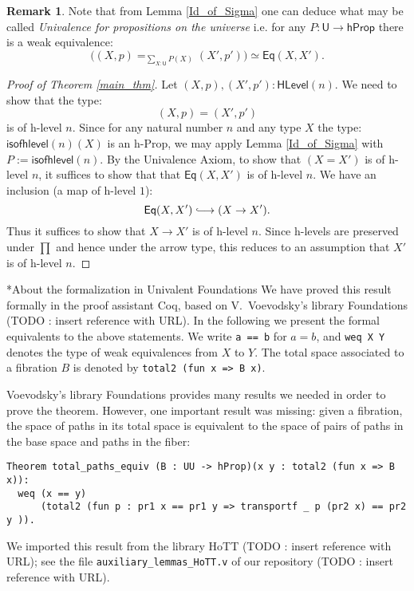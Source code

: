 \documentclass[11pt]{amsart}
\makeatletter
\theoremstyle{plain}
\theoremstyle{definition}
\newtheorem{remark}[theorem]{Remark}
\newcommand{\Eq}{\mathsf{Eq}}
\newcommand{\HLevel}{\mathsf{HLevel}}
\newcommand{\hProp}{\mathsf{hProp}}
\newcommand{\isofhlevel}{\mathsf{isofhlevel}}
\newcommand{\U}{\mathsf{U}}
\newcommand{\oftype}{\! : \!}
\newcommand*{\into}{\ensuremath{\lhook\joinrel\relbar\joinrel\rightarrow}}
\renewcommand{\paragraph}{\@startsection{paragraph}{4}{0mm}{-0.5\baselineskip}{-1ex}{\bf}}
\makeatother
\begin{document}
\begin{remark}
 Note that from Lemma \ref{Id_of_Sigma} one can deduce what may be called {\em Univalence for propositions on the universe} i.e. for any $P \colon \U \to \hProp$ there is a weak equivalence:
 \[ \Big( (X, p) =_{\sum\limits_{X : \U} P(X)} (X', p')\Big) \simeq \Eq (X, X'). \]
\end{remark}

\begin{proof}[Proof of Theorem \ref{main_thm}]
 Let $(X, p), (X', p') \oftype \HLevel(n)$. We need to show that the type:
 \[(X, p) = (X', p') \]
 is of h-level $n$. Since for any natural number $n$ and any type $X$ the type: $\isofhlevel(n)(X)$ is an h-Prop, we may apply Lemma \ref{Id_of_Sigma} with $P := \isofhlevel(n)$. By the Univalence Axiom, to show that $(X = X')$ is of h-level $n$, it suffices to show that that $\Eq(X, X')$ is of h-level $n$. We have an inclusion (a map of h-level $1$):
 \[\Eq (X, X') \into (X \rightarrow X').\]
 Thus it suffices to show that $X \rightarrow X'$ is of h-level $n$. Since h-levels are preserved under $\prod$ and hence under the arrow type, this reduces to an assumption that $X'$ is of h-level $n$.
\end{proof}

\paragraph*{About the formalization in Univalent Foundations}
We have proved this result formally in the proof assistant \textsf{Coq}, based on V.\ Voevodsky's 
library \textsf{Foundations} (TODO : insert reference with URL).
In the following we present the formal equivalents to the above statements. 
We write \lstinline!a == b! for $a = b$, and \lstinline!weq X Y! denotes the type of weak 
equivalences from $X$ to $Y$. The total space associated to a fibration $B$ is denoted by 
\lstinline!total2 (fun x => B x)!.

Voevodsky's library \textsf{Foundations} provides many results we needed in order to prove the theorem. However, one important
result was missing: given a fibration, the space of paths in its total space is equivalent to 
  the space of pairs of paths in the base space and paths in the fiber:
\begin{lstlisting}
Theorem total_paths_equiv (B : UU -> hProp)(x y : total2 (fun x => B x)):
  weq (x == y) 
      (total2 (fun p : pr1 x == pr1 y => transportf _ p (pr2 x) == pr2 y )).
\end{lstlisting}
We imported this result from the library \textsf{HoTT} (TODO : insert reference with URL); see the file
{\verb+auxiliary_lemmas_HoTT.v+} of our repository (TODO : insert reference with URL).
\end{document}
